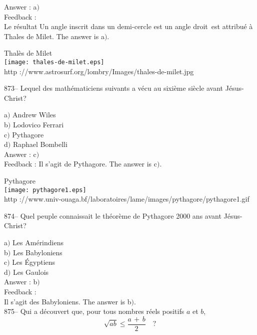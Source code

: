 \documentclass[letterpaper, 12pt]{article}
\begin{document}
Answer : a$)$\\

Feedback :\\
Le r\'esultat \og Un angle inscrit dans un demi-cercle est un angle
droit\fg\ est attribu\'e \`a Thales de Milet. The answer is a$)$.\\

        \begin{center}
        Thal\`es de Milet\\
    \texttt{[image: thales-de-milet.eps]}\\
        {\footnotesize http
://www.astrosurf.org/lombry/Images/thales-de-milet.jpg}
    \end{center}

873-- Lequel des math\'ematiciens suivants a v\'ecu au sixi\`eme
si\`ecle avant J\'esus-Christ?

a$)$ Andrew Wiles \\
b$)$ Lodovico Ferrari \\
c$)$ Pythagore \\
d$)$ Raphael Bombelli \\

Answer : c$)$\\

Feedback :
Il s'agit de Pythagore. The answer is c$)$.\\

        \begin{center}
        Pythagore\\
    \texttt{[image: pythagore1.eps]}\\
        {\footnotesize http
://www.univ-ouaga.bf/laboratoires/lame/images/pythagore/pythagore1.gif}
    \end{center}

874-- Quel peuple connaissait le th\'eor\`eme de Pythagore 2000 ans
avant J\'esus-Christ?

a$)$ Les Am\'erindiens \\
b$)$ Les Babyloniens \\
c$)$ Les \'Egyptiens \\
d$)$ Les Gaulois \\

Answer : b$)$\\

Feedback : \\
Il s'agit des Babyloniens. The answer is b$)$.\\

875-- Qui a d\'ecouvert que, pour tous nombres r\'eels positifs $a$ et $b$,
$$\sqrt{ab}\le\displaystyle\frac{a\,+\,b}2\quad?$$
\end{document}

